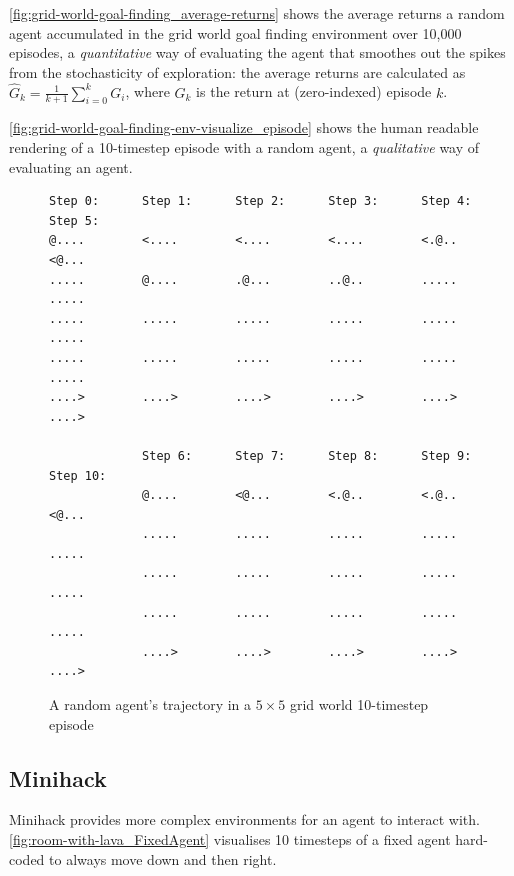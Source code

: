 \documentclass[12pt]{article}
\begin{document}
\autoref{fig:grid-world-goal-finding_average-returns} shows the average returns a random agent
accumulated in the grid world goal finding environment over 10,000 episodes, a \textit{quantitative}
way of evaluating the agent that smoothes out the spikes from the stochasticity of exploration:
the average returns are calculated as $\hat{G}_k = \frac{1}{k + 1} \sum_{i=0}^k{G_i}$,
where $G_k$ is the return at (zero-indexed) episode $k$.

\autoref{fig:grid-world-goal-finding-env-visualize_episode} shows the human readable rendering
of a 10-timestep episode with a random agent, a \textit{qualitative} way of evaluating an agent.

\begin{figure}[!h]
	\begin{verbatim}
Step 0:      Step 1:      Step 2:      Step 3:      Step 4:      Step 5:
@....        <....        <....        <....        <.@..        <@...
.....        @....        .@...        ..@..        .....        .....
.....        .....        .....        .....        .....        .....
.....        .....        .....        .....        .....        .....
....>        ....>        ....>        ....>        ....>        ....>

             Step 6:      Step 7:      Step 8:      Step 9:      Step 10:
             @....        <@...        <.@..        <.@..        <@...
             .....        .....        .....        .....        .....
             .....        .....        .....        .....        .....
             .....        .....        .....        .....        .....
             ....>        ....>        ....>        ....>        ....>
\end{verbatim}
	\caption{A random agent's trajectory in a $5 \times 5$ grid world 10-timestep episode}
	\label{fig:grid-world-goal-finding-env-visualize_episode}
\end{figure}

\subsection{Minihack}

Minihack provides more complex environments for an agent to interact with.
\autoref{fig:room-with-lava_FixedAgent} visualises 10 timesteps
of a fixed agent hard-coded to always move down and then right.
\end{document}
